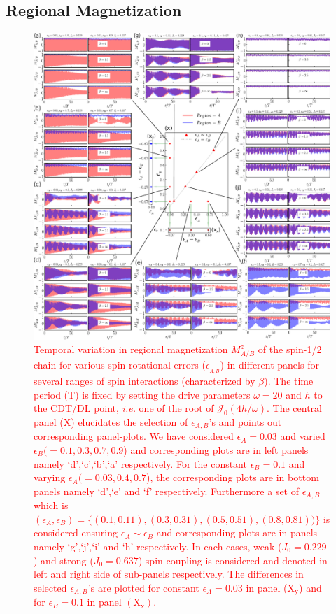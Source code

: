 \documentclass[12pt]{iopart}
\newcommand{\red}[1]{\textcolor{red}{#1}}
\begin{document}
\subsection{\label{sec:level42} Regional Magnetization}
\begin{figure}[t]
	\centering
	\includegraphics[width = 15.0cm]{figure8.pdf}
	\caption{\red{Temporal variation in regional magnetization $M^z_{A/B}$ of the spin-1/2 chain for various spin rotational errors ($\epsilon_{_{A,B}}$) in different panels for  several ranges of spin interactions (characterized by $\beta$). The time period (T) is fixed by setting the drive parameters $\omega=20$ and $h$ to the CDT/DL point, \textit{i.e.} one of the root of $\mathcal{J}_0(4h/\omega)$. The central panel (X) elucidates the selection of $\epsilon_{A,B}$'s and points out corresponding panel-plots. We have considered $\epsilon_A = 0.03$ and varied $\epsilon_B(= 0.1, 0.3, 0.7,0.9$) and corresponding plots are in left panels namely `d',`c',`b',`a' respectively.  For the constant $\epsilon_B = 0.1$ and varying $\epsilon_A ( = 0.03, 0.4,0.7$), the corresponding plots are in bottom panels namely `d',`e' and `f' respectively. Furthermore a set of $\epsilon_{A,B}$ which is $ (\epsilon_{A},\epsilon_{B}) = \{(0.1,0.11), (0.3,0.31),(0.5,0.51),(0.8,0.81))\}$ is considered ensuring $\epsilon_A\sim \epsilon_B$ and corresponding plots are in panels namely `g',`j',`i' and `h' respectively. In each cases, weak ($J_0 = 0.229$) and strong ($J_0 = 0.637$) spin coupling  is considered and denoted in left and right side of sub-panels respectively. The differences in selected $\epsilon_{A,B}$'s are plotted for constant $\epsilon_A = 0.03$ in panel ($\mathrm X_\mathrm{y}$) and for $\epsilon_B = 0.1$ in  panel $(\mathrm X_\mathrm{x})$.}}
	\label{Fig:reg_mag_ea_eb}
\end{figure}
\end{document}
